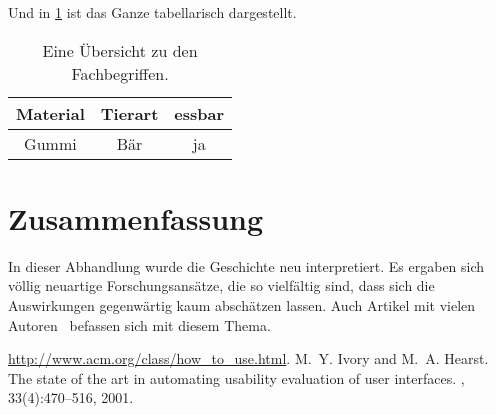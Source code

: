\documentclass[ngerman]{seminarvorlage}
\begin{document}
Und in \cref{tttabelle} ist das Ganze tabellarisch dargestellt.

\begin{table}[hp]\large
\begin{center}
\begin{tabular}{|c|c|c|}
\hline
Material & Tierart & essbar\\
\hline
Gummi & Bär & ja\\
\hline
\end{tabular}
\end{center}
\caption{Eine Übersicht zu den Fachbegriffen.}
\label{tttabelle}
\end{table}

\section{Zusammenfassung}
In dieser Abhandlung wurde die Geschichte neu interpretiert.
Es ergaben sich völlig neuartige Forschungsansätze, die so
vielfältig sind, dass sich die Auswirkungen gegen\-wärtig %
kaum abschätzen lassen. Auch Artikel mit vielen Autoren~\cite{Black1988}
befassen sich mit diesem Thema.

\pagebreak

%
\begin{thebibliography}{9}
\newblock \url{http://www.acm.org/class/how_to_use.html}.
%
M.~Y. Ivory and M.~A. Hearst.
\newblock The state of the art in automating usability evaluation of user
  interfaces.
, 33(4):470--516, 2001.

\end{thebibliography}


\end{document}
